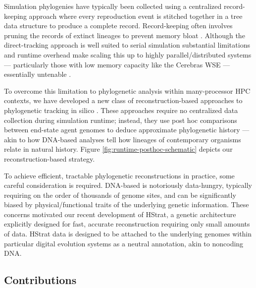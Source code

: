 Simulation phylogenies have typically been collected using a centralized record-keeping approach where every reproduction event is stitched together in a tree data structure to produce a complete record.
Record-keeping often involves pruning the records of extinct lineages to prevent memory bloat \citep{dolson2023phylotrack}.
Although the direct-tracking approach is well suited to serial simulation substantial limitations and runtime overhead make scaling this up to highly parallel/distributed systems --- particularly those with low memory capacity like the Cerebras WSE --- essentially untenable \citep{moreno2024analysis}.

To overcome this limitation to phylogenetic analysis within many-processor HPC contexts, we have developed a new class of reconstruction-based approaches to phylogenetic tracking in silico \citep{moreno2022hereditary}.
These approaches require no centralized data collection during simulation runtime; instead, they use post hoc comparisons between end-state agent genomes to deduce approximate phylogenetic history --- akin to how DNA-based analyses tell how lineages of contemporary organisms relate in natural history.
Figure \ref{fig:runtime-posthoc-schematic} depicts our reconstruction-based strategy.

To achieve efficient, tractable phylogenetic reconstructions in practice, some careful consideration is required.
DNA-based is notoriously data-hungry, typically requiring on the order of thousands of genome sites, and can be significantly biased by physical/functional traits of the underlying genetic information.
These concerns motivated our recent development of HStrat, a genetic architecture explicitly designed for fast, accurate reconstruction requiring only small amounts of data.
HStrat data is designed to be attached to the underlying genomes within particular digital evolution systems as a neutral annotation, akin to noncoding DNA.

\subsection{Contributions}

